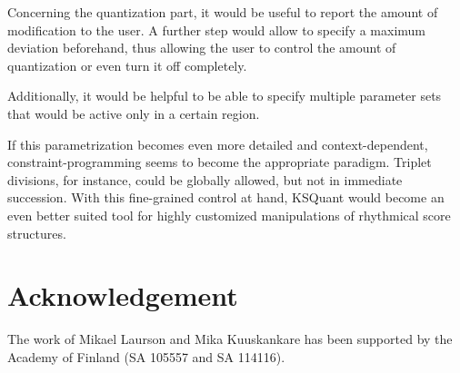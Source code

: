 \documentclass[runningheads,a4paper]{llncs}
\begin{document}
Concerning the quantization part, it would be useful to report the
amount of modification to the user. A further step would allow to
specify a maximum deviation beforehand, thus allowing the user to
control the amount of quantization or even turn it off completely.

Additionally, it would be helpful to be able to specify multiple
parameter sets that would be active only in a certain region.

If this parametrization becomes even more detailed and
context-dependent, constraint-programming seems to become the
appropriate paradigm. Triplet divisions, for instance, could be
globally allowed, but not in immediate succession. With this
fine-grained control at hand, KSQuant would become an even better
suited tool for highly customized manipulations of rhythmical score
structures.

\section{Acknowledgement}
The work of Mikael Laurson and Mika Kuuskankare has been supported by
the Academy of Finland (SA 105557 and SA 114116).

{}

\end{document}
